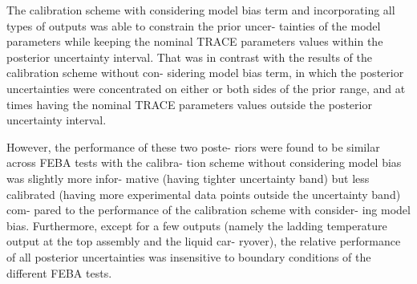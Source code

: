 The calibration scheme with considering model bias term and incorporating all types of outputs was able to constrain the prior uncer-
tainties of the model parameters while keeping the nominal TRACE
parameters values within the posterior uncertainty interval. That was
in contrast with the results of the calibration scheme without con-
sidering model bias term, in which the posterior uncertainties were
concentrated on either or both sides of the prior range, and at times
having the nominal TRACE parameters values outside the posterior
uncertainty interval.


However, the performance of these two poste-
riors were found to be similar across FEBA tests with the calibra-
tion scheme without considering model bias was slightly more infor-
mative (having tighter uncertainty band) but less calibrated (having
more experimental data points outside the uncertainty band) com-
pared to the performance of the calibration scheme with consider-
ing model bias. Furthermore, except for a few outputs (namely the
ladding temperature output at the top assembly and the liquid car-
ryover), the relative performance of all posterior uncertainties was
insensitive to boundary conditions of the different FEBA tests.